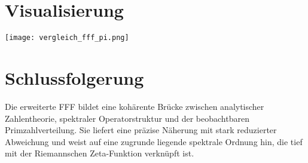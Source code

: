 \documentclass[12pt]{article}
\begin{document}
\section*{Visualisierung}

\begin{center}
\texttt{[image: vergleich\_fff\_pi.png]}
\end{center}

\vspace{1em}

\section*{Schlussfolgerung}

Die erweiterte FFF bildet eine kohärente Brücke zwischen analytischer Zahlentheorie, spektraler Operatorstruktur und der beobachtbaren Primzahlverteilung. Sie liefert eine präzise Näherung mit stark reduzierter Abweichung und weist auf eine zugrunde liegende spektrale Ordnung hin, die tief mit der Riemannschen Zeta-Funktion verknüpft ist.
\end{document}
